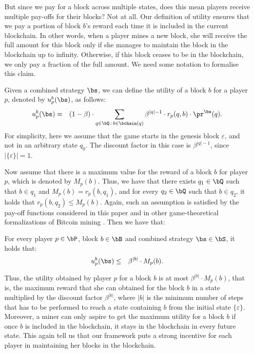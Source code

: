 But since we pay for a block across multiple states, does this mean players receive multiple pay-offs for their blocks? Not at all. 
Our definition of utility ensures that we pay a portion of block $b$'s reward each time it is included in the current blockchain. In other words, 
when a player mines a new block, she will receive the full amount for this block only if she manages to maintain the block in the blockchain up to infinity. Otherwise, if this block 
ceases to be in the blockchain, we only pay a fraction of the full amount. We need some notation to formalise this claim.  

Given a combined strategy $\bs$, we can define the utility of a block $b$ for a player $p$, denoted by $u_p^b(\bs)$,  as follows:
\begin{eqnarray*}
u_p^b(\bs) & =  & (1 - \beta) \cdot  \sum_{q \in \bQ \,:\, b \in \bchain(q)} \beta^{|q|-1} \cdot  r_p(q,b) \cdot \pr^{\bs}(q).
\end{eqnarray*}
For simplicity, here we assume that the game starts in the genesis block $\varepsilon$, and not in an arbitrary state $q_0$. The discount factor in this case is $\beta^{|q|-1}$, since $|\{\varepsilon\}|= 1$.  

Now assume that there is a maximum value for the reward of a block $b$ for player $p$, which is denoted by $M_p(b)$. Thus, we have that there exists $q_1 \in \bQ$ such that $b \in q_1$ and $M_p(b) = r_p(b,q_1)$, and for every $q_2 \in \bQ$ such that $b \in q_2$, it holds that $r_p(b,q_2) \leq M_p(b)$. Again, such an assumption is satisfied by the pay-off functions considered in this paper and in other game-theoretical formalizations of Bitcoin mining \cite{mininggames:2016}. Then we have that:
\begin{myprop}\label{prop-ub-block}
For every player $p \in \bP$, block $b \in \bB$ and combined strategy $\bs \in \bS$, it holds that:
\begin{eqnarray*}
u^b_p(\bs) & \leq &  \beta^{|b|} \cdot M_p(b).
\end{eqnarray*}
\end{myprop}
Thus, the utility obtained by player $p$ for a block $b$ is at most $\beta^{|b|} \cdot M_p(b)$, that is, the maximum reward that she can obtained for the block $b$ in a state multiplied by the discount factor $\beta^{|b|}$, where $|b|$ is the minimum number of steps that has to be performed to reach a state containing $b$ from the initial state $\{\varepsilon\}$. 
Moreover, a miner can only aspire to get the maximum utility for a block $b$ if once $b$ is included in the blockchain, it stays in the blockchain in every future state. This again tell us that our framework puts a strong incentive for each player in maintaining her blocks in the blockchain.


